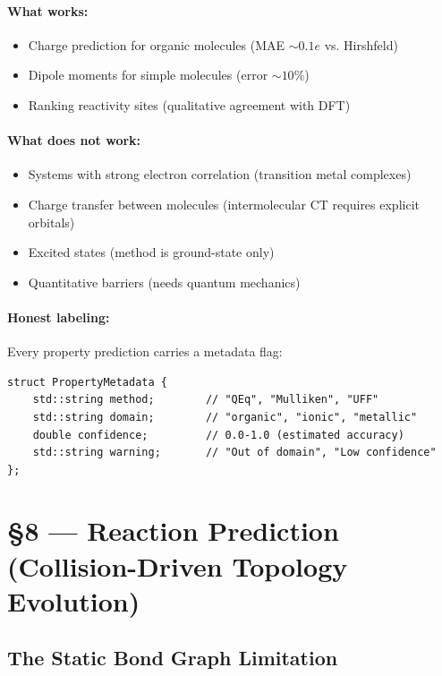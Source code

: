 \documentclass[11pt]{article}
\begin{document}
\paragraph{What works:}
\begin{itemize}
\item Charge prediction for organic molecules (MAE $\sim 0.1e$ vs. Hirshfeld)
\item Dipole moments for simple molecules (error $\sim 10\%$)
\item Ranking reactivity sites (qualitative agreement with DFT)
\end{itemize}

\paragraph{What does not work:}
\begin{itemize}
\item Systems with strong electron correlation (transition metal complexes)
\item Charge transfer between molecules (intermolecular CT requires explicit orbitals)
\item Excited states (method is ground-state only)
\item Quantitative barriers (needs quantum mechanics)
\end{itemize}

\paragraph{Honest labeling:} Every property prediction carries a metadata flag:
\begin{lstlisting}
struct PropertyMetadata {
    std::string method;        // "QEq", "Mulliken", "UFF"
    std::string domain;        // "organic", "ionic", "metallic"
    double confidence;         // 0.0-1.0 (estimated accuracy)
    std::string warning;       // "Out of domain", "Low confidence"
};
\end{lstlisting}

\section{§8 — Reaction Prediction (Collision-Driven Topology Evolution)}

\subsection{The Static Bond Graph Limitation}
\end{document}
